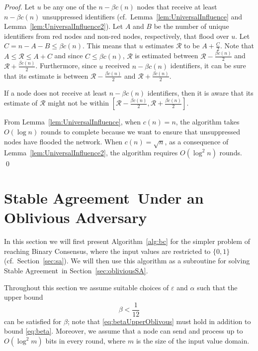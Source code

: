 \documentclass[leqno,11pt]{article}
\renewcommand{\le}{\leqslant}
\newcommand{\set}[1]{\{#1\}}
\newcommand{\eps}{\varepsilon}
\newcommand{\R}{{\mathcal{R}}}
\newcommand{\sa}{{\sc Stable Agreement}}
\newcommand{\bc}{{\sc Binary Consensus}}
\begin{document}
{\begin{proof}
Let $u$ be any one of the $n-\beta c(n)$ nodes that receive at least $n-\beta
c(n)$ unsuppressed identifiers (cf.\ Lemma~\ref{lem:UniversalInfluence} and
Lemma~\ref{lem:UniversalInfluence2}). Let $A$ and $B$ be the number of unique
identifiers from red nodes and non-red nodes, respectively, that flood over $u$.
Let $C = n - A - B \le \beta c(n)$. This means that $u$ estimates $\R$ to be
$A+\frac{C}{2}$. Note that $ A \le \R \le A+C$ and since $C \le \beta c(n)$, $\R$
is estimated between $\R - \frac{\beta c(n)}{2}$ and $\R+ \frac{\beta c(n)}{2}$.
Furthermore, since $u$ received $n - \beta c(n)$ identifiers, it can be sure
that its estimate is between $\R - \frac{\beta c(n)}{2}$ and $\R+ \frac{\beta
c(n)}{2}$.

If a node does not receive at least $n - \beta c(n)$ identifiers, then it is
aware that its estimate of $\R$ might not be within $[\R - \frac{\beta
c(n)}{2}, \R+ \frac{\beta c(n)}{2}]$.

From Lemma~\ref{lem:UniversalInfluence}, when $c(n) = n$,  the algorithm takes $O(\log n)$ rounds to complete because we want to ensure that unsuppressed nodes have flooded the network. When $c(n) = \sqrt{n}$, as a consequence of Lemma~\ref{lem:UniversalInfluence2}, the algorithm requires $O(\log^2 n)$ rounds. 
\qed
\end{proof}

}










\section{\sa\ Under an Oblivious Adversary} \label{sec:oblivious}

In this section we will first present Algorithm~\ref{alg:bc} for the simpler
problem of reaching \bc, where the input values are restricted to $\set{0,1}$
(cf.\ Section~\ref{sec:sa}). We will then use this algorithm as a subroutine
for solving \sa\ in Section~\ref{sec:obliviousSA}.

Throughout this section we assume suitable choices of $\eps$ and $\alpha$ such
that the upper bound 
\begin{equation} \label{eq:betaUpperOblivous}
\beta<\frac{1}{12}
\end{equation}
can be satisfied for $\beta$; note that \eqref{eq:betaUpperOblivous} must hold
in addition to bound \eqref{eq:beta}.
Moreover, we assume that a node can send and process up to
$O(\log^2 m)$ bits in every round, where $m$ is the size of the input value
domain.  
\end{document}
